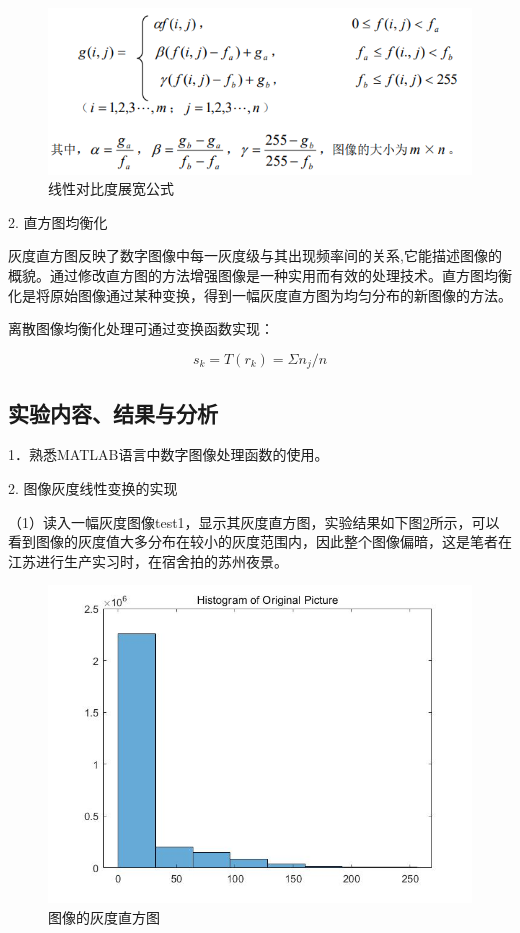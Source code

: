 \documentclass[UTF8]{article} %
\begin{document}
	\begin{figure}[H]
		\centering
		\includegraphics[width=0.7\linewidth]{screenshot040}
		\caption{线性对比度展宽公式}
		\label{fig:screenshot040}
	\end{figure}

	
	2. 直方图均衡化
	
	灰度直方图反映了数字图像中每一灰度级与其出现频率间的关系,它能描述图像的概貌。通过修改直方图的方法增强图像是一种实用而有效的处理技术。直方图均衡化是将原始图像通过某种变换，得到一幅灰度直方图为均匀分布的新图像的方法。  
	 
	离散图像均衡化处理可通过变换函数实现：

	\begin{equation}
		s_{k} = T(r_{k})=\Sigma n_{j}/n
	\end{equation}
	
	\subsection{实验内容、结果与分析}
	1．熟悉MATLAB语言中数字图像处理函数的使用。
	
	2. 图像灰度线性变换的实现
	
	（1）读入一幅灰度图像test1，显示其灰度直方图，实验结果如下图\ref{fig:1-3}所示，可以看到图像的灰度值大多分布在较小的灰度范围内，因此整个图像偏暗，这是笔者在江苏进行生产实习时，在宿舍拍的苏州夜景。
	
	\begin{figure}[H]
		\centering
		\includegraphics[width=0.5\linewidth]{1-3}
		\caption{图像的灰度直方图}
		\label{fig:1-3}
	\end{figure}
\end{document}
